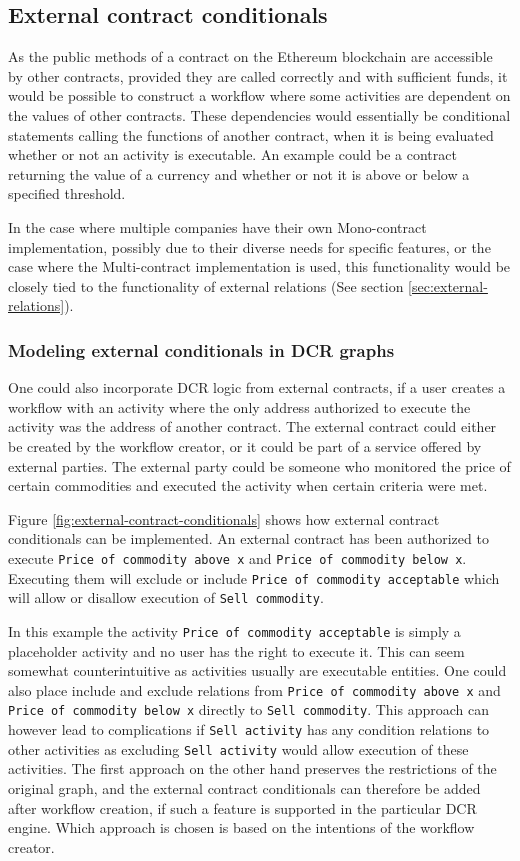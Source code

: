 \documentclass{article}
\begin{document}
		\subsection{External contract conditionals}
		As the public methods of a contract on the Ethereum blockchain are accessible by other contracts, provided they are called correctly and with sufficient funds, it would be possible to construct a workflow where some activities are dependent on the values of other contracts.
		These dependencies would essentially be conditional statements calling the functions of another contract, when it is being evaluated whether or not an activity is executable. 
		An example could be a contract returning the value of a currency and whether or not it is above or below a specified threshold.

		In the case where multiple companies have their own Mono-contract implementation, possibly due to their diverse needs for specific features, or the case where the Multi-contract implementation is used, this functionality would be closely tied to the functionality of external relations (See section \ref{sec:external-relations}).

			\subsubsection{Modeling external conditionals in DCR graphs}
			One could also incorporate DCR logic from external contracts, if a user creates a workflow with an activity where the only address authorized to execute the activity was the address of another contract.
			The external contract could either be created by the workflow creator, or it could be part of a service offered by external parties.
			The external party could be someone who monitored the price of certain commodities and executed the activity when certain criteria were met.
			
			Figure \ref{fig:external-contract-conditionals} shows how external contract conditionals can be implemented. 
			An external contract has been authorized to execute \texttt{Price of commodity above x} and \texttt{Price of commodity below x}. 
			Executing them will exclude or include \texttt{Price of commodity acceptable} which will allow or disallow execution of \texttt{Sell commodity}.
			
			In this example the activity \texttt{Price of commodity acceptable} is simply a placeholder activity and no user has the right to execute it.
			This can seem somewhat counterintuitive as activities usually are executable entities. 
			One could also place include and exclude relations from \texttt{Price of commodity above x} and \texttt{Price of commodity below x} directly to \texttt{Sell commodity}.
			This approach can however lead to complications if \texttt{Sell activity} has any condition relations to other activities as excluding \texttt{Sell activity} would allow execution of these activities.
			The first approach on the other hand preserves the restrictions of the original graph, and the external contract conditionals can therefore be added after workflow creation, if such a feature is supported in the particular DCR engine.
			Which approach is chosen is based on the intentions of the workflow creator.
\end{document}
